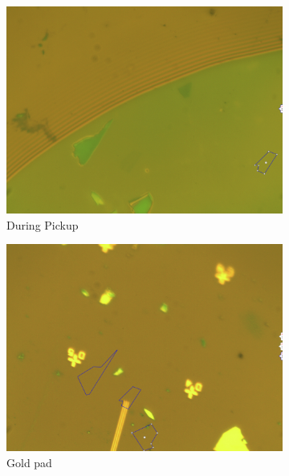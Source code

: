 \begin{figure}[H]
\begin{subfigure}[b]{0.4\textwidth}
		\includegraphics[width=\textwidth]{figures/during_pickup.jpg}
		\caption{During Pickup}
	\end{subfigure}
	\qquad
	\begin{subfigure}[b]{0.4\textwidth}
		\centering
		\includegraphics[width=\textwidth]{figures/gold_pad.jpg}
		\caption{Gold pad}
	\end{subfigure}
	\begin{subfigure}[b]{0.4\textwidth}
		\centering

\end{subfigure}
\end{figure}

